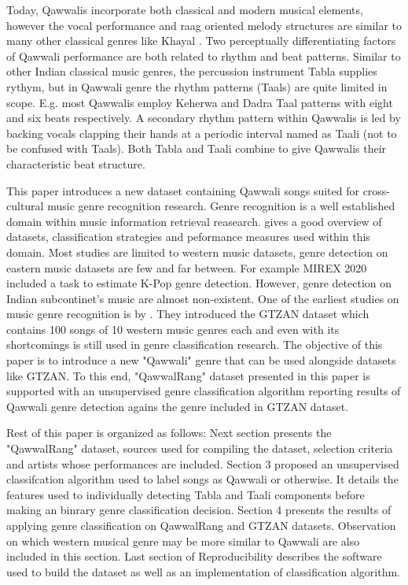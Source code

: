 \documentclass{article}
\begin{document}
Today, Qawwalis incorporate both classical and modern musical elements, however the vocal performance and raag oriented melody structures are similar to many other classical genres like Khayal \citep{qureshi1986sufi}. Two perceptually differentiating factors of Qawwali performance are both related to rhythm and beat patterns. Similar to other Indian classical music genres, the percussion instrument Tabla  supplies rythym, but in Qawwali genre the rhythm patterns (Taals) are quite limited in scope. E.g. most Qawwalis employ Keherwa  and Dadra Taal patterns with eight and six beats respectively. A secondary rhythm pattern within Qawwalis is led by backing vocals clapping their hands at a periodic interval named as Taali (not to be confused with Taals). Both Tabla and Taali combine to give Qawwalis their characteristic beat structure.

This paper introduces a new dataset containing Qawwali songs suited for cross-cultural music genre recognition research. Genre recognition is a well established domain within music information retrieval reasearch. \cite{music_genre_survey} gives a good overview of datasets, classification strategies and peformance measures used within this domain. Most studies are limited to western music datasets, genre detection on eastern music datasets are few and far between. For example MIREX 2020 \citep{mirex} included a task to estimate K-Pop genre detection. However, genre detection on Indian subcontinet's music are almost non-existent. One of the earliest studies on music genre recognition is by \cite{gtzan}. They introduced the GTZAN dataset which contains 100 songs of 10 western music genres each and even with its shortcomings is still used in genre classification research. The objective of this paper is to introduce a new "Qawwali" genre that can be used alongside datasets like GTZAN. To this end, "QawwalRang" dataset presented in this paper is supported with an unsupervised genre classification algorithm  reporting results of Qawwali genre detection agains the genre included in GTZAN dataset.

Rest of this paper is organized as follows: Next section presents the "QawwalRang" dataset, sources used for compiling the dataset, selection criteria and artists whose performances are included. Section 3 proposed an unsupervised classifcation algorithm used to label songs as Qawwali or otherwise. It details the features used to individually detecting Tabla and Taali components before making an binrary genre classification decision. Section 4 presents the results of applying genre classification on QawwalRang and GTZAN datasets. Observation on which western musical genre may be more similar to Qawwali are also included in this section. Last section of Reproducibility describes the software used to build the dataset as well as an implementation of classification algorithm.
\end{document}
